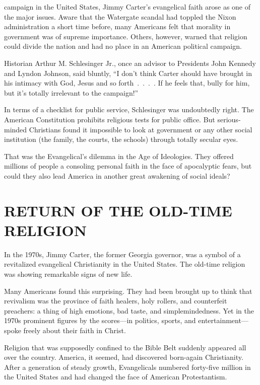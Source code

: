 
 campaign in the United States, Jimmy Carter’s evangelical
faith arose as one of the major issues. Aware that the Watergate scandal had toppled the Nixon
administration a short time before, many Americans felt that morality in government was of supreme
importance. Others, however, warned that religion could divide the nation and had no place in an
American political campaign.

Historian Arthur M. Schlesinger Jr., once an advisor to Presidents John Kennedy and Lyndon Johnson,
said bluntly, “I don’t think Carter should have brought in his intimacy with God, Jesus and so
forth~.~.~.~. If he feels that, bully for him, but it’s totally irrelevant to the campaign!”

In terms of a checklist for public service, Schlesinger was undoubtedly right. The American
Constitution prohibits religious tests for public office. But serious-minded Christians found it
impossible to look at government or any other social institution (the family, the courts, the
schools) through totally secular eyes.

That was the Evangelical’s dilemma in the Age of Ideologies. They offered millions of people a
consoling personal faith in the face of apocalyptic fears, but could they also lead America in
another great awakening of social ideals?

\section{RETURN OF THE OLD-TIME RELIGION}

In the 1970s, Jimmy Carter, the former Georgia governor, was a symbol of a revitalized evangelical
Christianity in the United States. The old-time religion was showing remarkable signs of new life.

Many Americans found this surprising. They had been brought up to think that revivalism was the
province of faith healers, holy rollers, and counterfeit preachers: a thing of high emotions, bad
taste, and simplemindedness. Yet in the 1970s prominent figures by the scores—in politics, sports,
and entertainment—spoke freely about their faith in Christ.

Religion that was supposedly confined to the Bible Belt suddenly appeared all over the country.
America, it seemed, had discovered born-again Christianity. After a generation of steady growth,
Evangelicals numbered forty-five million in the United States and had changed the face of American
Protestantism.

